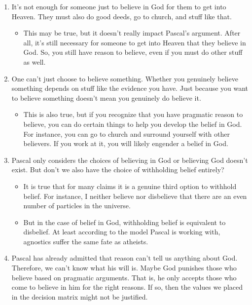 \begin{enumerate}
 \item It's not enough for someone just to believe in God for them to get into Heaven.  They must also do good deeds, go to church, and stuff like that.
 \begin{itemize}
  \item This may be true, but it doesn't really impact Pascal's argument.  After all, it's still necessary for someone to get into Heaven that they believe in God. So, you still have reason to believe, even if you must do other stuff as well.
 \end{itemize}
 \item One can't just choose to believe something.  Whether you genuinely believe something depends on stuff like the evidence you have. Just because you want to believe something doesn't mean you genuinely do believe it.
 \begin{itemize}
  \item This is also true, but if you recognize that you have pragmatic reason to believe, you can do certain things to help you develop the belief in God.  For instance, you can go to church and surround yourself with other believers.  If you work at it, you will likely engender a belief in God.
 \end{itemize}
 \item Pascal only considers the choices of believing in God or believing God doesn't exist. But don't we also have the choice of withholding belief entirely?
 \begin{itemize}
  \item It is true that for many claims it is a genuine third option to withhold belief. For instance, I neither believe nor disbelieve that there are an even number of particles in the universe.
  \item But in the case of belief in God, withholding belief is equivalent to disbelief.  At least according to the model Pascal is working with, agnostics suffer the same fate as atheists.
 \end{itemize}

 \item Pascal has already admitted that reason can't tell us anything about God.  Therefore, we can't know what his will is.  Maybe God punishes those who believe based on pragmatic arguments.  That is, he only accepts those who come to believe in him for the right reasons.  If so, then the values we placed in the decision matrix might not be justified.


\end{enumerate}
